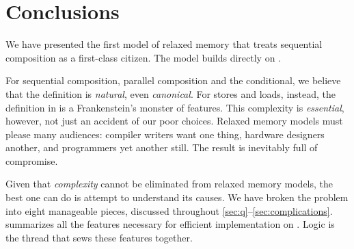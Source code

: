 \section{Conclusions}

We have presented the first model of relaxed memory that treats sequential
composition as a first-class citizen. The model builds directly on \jjr{}.

For sequential composition, parallel composition and the conditional, we
believe that the definition is \emph{natural}, even \emph{canonical}.
For stores and loads, instead, the definition in  is a
Frankenstein's monster of features.  This complexity is \emph{essential},
however, not just an accident of our poor choices.  Relaxed memory models must
please many audiences: compiler writers want one thing, hardware designers
another, and programmers yet another still.  The result is inevitably full of
compromise.

Given that \emph{complexity} cannot be eliminated from relaxed memory models,
the best one can do is attempt to understand its causes.  We have broken the
problem into eight manageable pieces, discussed throughout
\textsection\ref{sec:q}--\ref{sec:complications}.  
summarizes all the features necessary for efficient implementation on
\armeight{}.
{Logic} is the thread that sews these features together.




